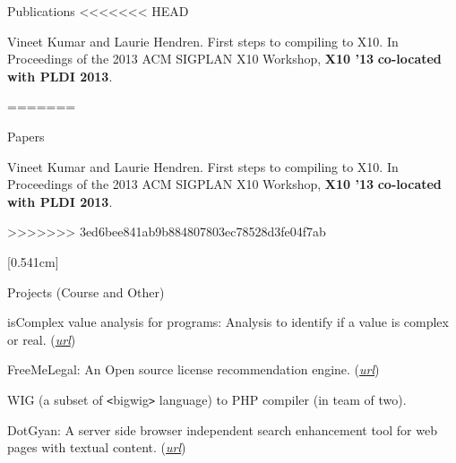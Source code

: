 \documentclass{resume} %
\begin{document}
\begin{rSection}{Publications}
<<<<<<< HEAD
\begin{lSubsection}
\smallskip
\item Vineet Kumar and Laurie Hendren. First steps to compiling \matlab to \textsc{X10}.
In Proceedings of the 2013 ACM SIGPLAN X10 Workshop, \textbf{X10 '13} \textbf{co-located with PLDI 2013}.
\end{lSubsection}
=======
\begin{rSubsection}{Papers}{}{}{}
\item Vineet Kumar and Laurie Hendren. First steps to compiling \matlab to \textsc{X10}.
In Proceedings of the 2013 ACM SIGPLAN X10 Workshop, \textbf{X10 '13} \textbf{co-located with PLDI 2013}.
\end{rSubsection}
>>>>>>> 3ed6bee841ab9b884807803ec78528d3fe04f7ab
\end{rSection}
\newpage
[0.541cm]
\begin{rSection}{Projects (Course and Other)}
\smallskip
\begin{lSubsection}
    \item isComplex value analysis for \matlab programs: Analysis to identify if a value is complex or real.
    (\href{https://github.com/Sable/mclab/tree/master/languages/Natlab/src/natlab/tame/valueanalysis/components/isComplex}{\em{url}}) 
    \item FreeMeLegal: An Open source license recommendation engine.
    (\href{http://vineetkumar.net/freeMeLegal/free-me-legal_final_report.pdf}{\em{url}})
    \item WIG (a subset of \verb+<+bigwig\verb+>+ language) to PHP compiler (in team of two).
    \item DotGyan: A server side browser independent search enhancement tool for web pages with textual content.
    (\href{http://vineetkumar.net/dotgyan/}{\em{url}})
\end{lSubsection}
\end{rSection}

\end{document}
